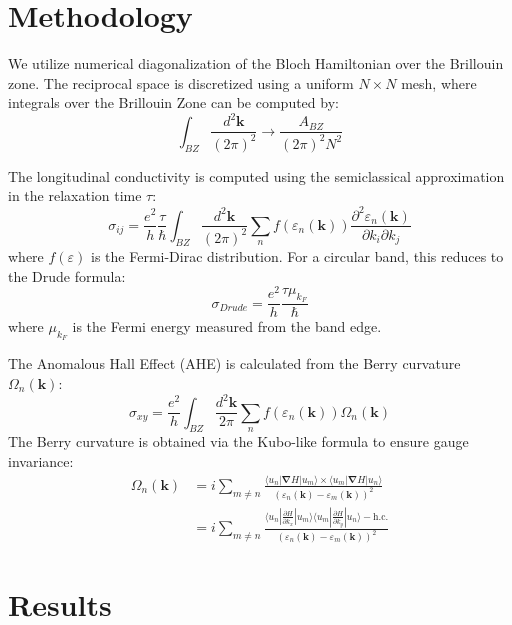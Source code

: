\documentclass[12pt,a4paper]{article}
\newcommand{\kk}{\mathbf{k}}
\begin{document}
\section{Methodology}
We utilize numerical diagonalization of the Bloch Hamiltonian over the Brillouin zone. The reciprocal space is discretized using a uniform $N \times N$ mesh, where integrals over the Brillouin Zone can be computed by:
\begin{equation}
    \int_{BZ} \frac{d^2\kk}{(2\pi)^2} \rightarrow \frac{A_{BZ}}{(2\pi)^2 N^2}
\end{equation}

The longitudinal conductivity is computed using the semiclassical approximation in the relaxation time $\tau$:
\begin{equation}
    \sigma_{ij} = \frac{e^2}{h} \frac{\tau}{\hbar} \int_{BZ} \frac{d^2\kk}{(2\pi)^2} \sum_n f(\varepsilon_n(\kk)) \frac{\partial^2\varepsilon_n(\kk)}{\partial k_i \partial k_j}
\end{equation}
where $f(\varepsilon)$ is the Fermi-Dirac distribution. For a circular band, this reduces to the Drude formula:
\begin{equation}
    \sigma_{Drude} = \frac{e^2}{h} \frac{\tau \mu_{k_F}}{\hbar}
\end{equation}
where $\mu_{k_F}$ is the Fermi energy measured from the band edge.

The Anomalous Hall Effect (AHE) is calculated from the Berry curvature $\Omega_n(\kk)$:
\begin{equation}
    \sigma_{xy} = \frac{e^2}{h} \int_{BZ} \frac{d^2\kk}{2\pi} \sum_n f(\varepsilon_n(\kk)) \Omega_n(\kk)
\end{equation}
The Berry curvature is obtained via the Kubo-like formula to ensure gauge invariance:
\begin{align}
    \Omega_n(\kk) &= i \sum_{m \neq n} \frac{\langle u_n | \mathbf{\nabla}H | u_m \rangle \times \langle u_m | \mathbf{\nabla}H | u_n \rangle}{(\varepsilon_n(\kk) - \varepsilon_m(\kk))^2} \\
    &= i \sum_{m \neq n} \frac{\langle u_n | \frac{\partial H}{\partial k_x} | u_m \rangle \langle u_m | \frac{\partial H}{\partial k_y} | u_n \rangle - \text{h.c.}}{(\varepsilon_n(\kk) - \varepsilon_m(\kk))^2}
\end{align}

\section{Results}
\end{document}

